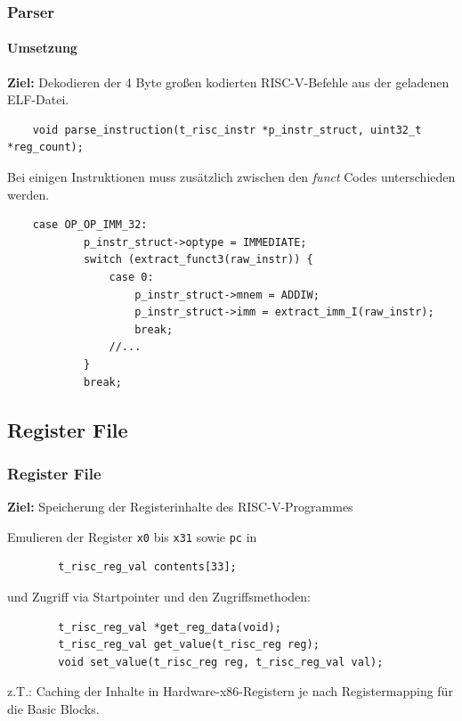 \documentclass[german]{tum-presentation}
\begin{document}
\begin{frame}[fragile]
	\frametitle{Parser}
	\framesubtitle{Umsetzung}
	\textbf{Ziel:} Dekodieren der 4 Byte großen kodierten RISC-V-Befehle aus der geladenen ELF-Datei.
	\begin{lstlisting}
	void parse_instruction(t_risc_instr *p_instr_struct, uint32_t *reg_count);
	\end{lstlisting}
	Bei einigen Instruktionen muss zusätzlich zwischen den \textit{funct} Codes unterschieden werden.
	\begin{lstlisting}
    case OP_OP_IMM_32:
            p_instr_struct->optype = IMMEDIATE;
            switch (extract_funct3(raw_instr)) {
                case 0:
                    p_instr_struct->mnem = ADDIW;
                    p_instr_struct->imm = extract_imm_I(raw_instr);
                    break;
                //...
            }
            break;
	\end{lstlisting}
\end{frame}



\subsection{Register File} %
\begin{frame}[fragile]
	\frametitle{Register File}
	\textbf{Ziel:} Speicherung der Registerinhalte des RISC-V-Programmes
	
	\vspace{1cm}
	\pause
	Emulieren der Register \verb!x0! bis \verb!x31! sowie \verb!pc! in
	\begin{lstlisting}
		t_risc_reg_val contents[33];
	\end{lstlisting}
	
	\pause
	und Zugriff via Startpointer und den Zugriffsmethoden:
	
	\begin{lstlisting}
		t_risc_reg_val *get_reg_data(void);
		t_risc_reg_val get_value(t_risc_reg reg);
		void set_value(t_risc_reg reg, t_risc_reg_val val);
	\end{lstlisting}
	
	z.T.: Caching der Inhalte in Hardware-x86-Registern je nach Registermapping für die Basic Blocks.
\end{frame}
\end{document}
